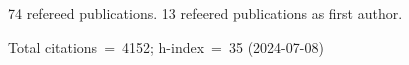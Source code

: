 74 refereed publications. 13 refeered publications as first author.

Total citations~=~4152; h-index~=~35 (2024-07-08)